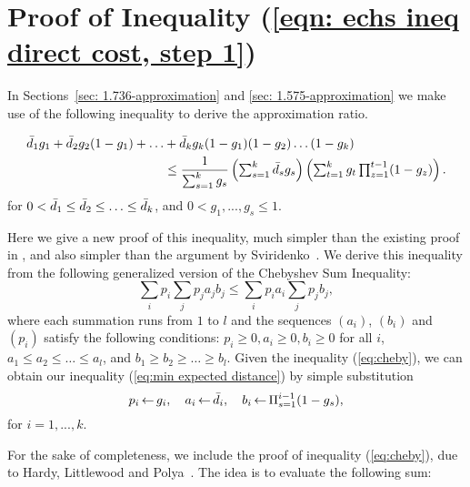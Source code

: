 \documentclass[oneside,final]{ucr}
\def\dsp{\def\baselinestretch{2.0}\large\normalsize}
\def\ssp{\def\baselinestretch{1.0}\large\normalsize}
\begin{document}
\section{Proof of Inequality (\ref{eqn: echs ineq direct
    cost, step 1})}
\label{sec: ECHSinequality}

In Sections~\ref{sec: 1.736-approximation} and \ref{sec:
  1.575-approximation} we make use of the following
inequality to derive the approximation ratio.
%

\ssp
\begin{align}
  \label{eq:min expected distance}
  {\bar d}_1 g_1 + {\bar d}_2 g_2 (1-g_1) +
  \ldots &+ {\bar d}_k g_k (1-g_1) (1-g_2) \ldots (1-g_k)\\ \notag
  &\leq \frac{1}{\sum_{s=1}^k g_s} \left(\textstyle\sum_{s=1}^k {\bar d}_s g_s\right)\left(\textstyle\sum_{t=1}^k g_t \textstyle\prod_{z=1}^{t-1} (1-g_z)\right).
\end{align}
\dsp
for $0 < {\bar d}_1\leq {\bar d}_2 \leq \ldots \leq {\bar d}_k$, and
$0 < g_1,...,g_s \le 1$.

\medskip

Here we give a new proof of this inequality, much simpler
than the existing proof in \cite{ChudakS04}, and also
simpler than the argument by Sviridenko~\cite{Svi02}.  We
derive this inequality from the following generalized
version of the Chebyshev Sum Inequality:
%
\begin{equation}
  \label{eq:cheby}
  \textstyle{\sum_{i}} p_i \textstyle{\sum_j} p_j a_j b_j \leq \textstyle{\sum_i} p_i a_i \textstyle{\sum_j} p_j b_j,
\end{equation}
%
where each summation runs from $1$ to $l$ and the sequences
$(a_i)$, $(b_i)$ and $(p_i)$ satisfy the following
conditions: $p_i\geq 0, a_i \geq 0, b_i \geq 0$ for all $i$,
$a_1\leq a_2 \leq \ldots \leq a_l$, and $b_1 \geq b_2 \geq
\ldots \geq b_l$. Given the inequality (\ref{eq:cheby}), we
can obtain our inequality (\ref{eq:min expected distance})
by simple substitution
%
\begin{equation*}
  p_i {\,\leftarrow\,} g_i,\quad a_i {\,\leftarrow\,} {\bar d}_i,\quad b_i {\,\leftarrow\,}
  \Pi_{s=1}^{i-1} (1-g_s),
\end{equation*}
%
for $i = 1,...,k$.

For the sake of completeness, we include the proof of
inequality (\ref{eq:cheby}), due to Hardy, Littlewood and
Polya~\cite{HardyLP88}. The idea is to evaluate the
following sum:
\end{document}
